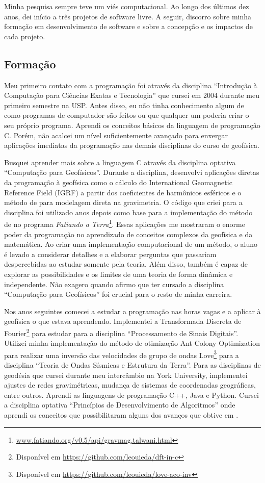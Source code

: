 \documentclass[12pt,a4paper,oneside,titlepage,onecolumn]{article}
\begin{document}
Minha pesquisa sempre teve um viés computacional.
Ao longo dos últimos dez anos, dei início a três projetos de software livre.
A seguir, discorro sobre minha formação em desenvolvimento de software e sobre
a concepção e os impactos de cada projeto.


\subsection{Formação}

Meu primeiro contato com a programação foi através da disciplina
``Introdução à Computação para Ciências Exatas e Tecnologia''
que cursei em 2004 durante meu primeiro semestre na USP.
Antes disso, eu não tinha conhecimento algum de como programas de computador
são feitos ou que qualquer um poderia criar o seu próprio programa.
Aprendi os conceitos básicos da linguagem de programação C.
Porém, não acalcei um nível suficientemente avançado para enxergar aplicações
imediatas da programação nas demais disciplinas do curso de geofísica.

Busquei aprender mais sobre a linguagem C através da disciplina optativa
``Computação para Geofísicos''.
Durante a disciplina, desenvolvi aplicações diretas da programação à geofísica
como o cálculo do International Geomagnetic Reference Field (IGRF) a partir dos
coeficientes de harmônicos esféricos e o método de \citet{talwani1959} para
modelagem direta na gravimetria.
O código que criei para a disciplina foi utilizado anos depois como base
para a implementação do método de \citet{talwani1959} no programa
\textit{Fatiando a
Terra}\footnote{\url{www.fatiando.org/v0.5/api/gravmag.talwani.html}}.
Essas aplicações me mostraram o enorme poder da programação no aprendizado de
conceitos complexos da geofísica e da matemática.
Ao criar uma implementação computacional de um método, o aluno é levado a
considerar detalhes e a elaborar perguntas que passariam despercebidas ao
estudar somente pela teoria.
Além disso, também é capaz de explorar as possibilidades e os limites de uma
teoria de forma dinâmica e independente.
Não exagero quando afirmo que ter cursado a disciplina ``Computação para
Geofísicos'' foi crucial para o resto de minha carreira.

Nos anos seguintes comecei a estudar a programação nas horas vagas e a aplicar
à geofísica o que estava aprendendo.
Implementei a Transformada Discreta de Fourier\footnote{Disponível em
\url{https://github.com/leouieda/dft-in-c}} para estudar para a disciplina
``Processamento de Sinais Digitais''.
Utilizei minha implementação do método de otimização Ant Colony Optimization
\citep{socha2008} para realizar uma inversão das velocidades de grupo de ondas
Love\footnote{Disponível em \url{https://github.com/leouieda/love-aco-inv}}
para a disciplina ``Teoria de Ondas Sísmicas e Estrutura da Terra''.
Para as disciplinas de geodésia que cursei durante meu intercâmbio na York
University, implementei ajustes de redes gravimétricas, mudança de sistemas de
coordenadas geográficas, entre outros.
Aprendi as linguagens de programação C++, Java e Python.
Cursei a disciplina optativa ``Princípios de Desenvolvimento de Algoritmos''
onde aprendi os conceitos que possibilitaram alguns dos avanços que obtive em
\citet{tesseroids}.
\end{document}
